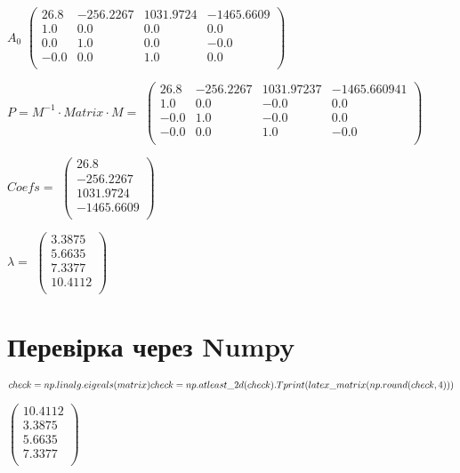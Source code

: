 \documentclass{article}
\begin{document}
    $A_0$
    $
    \left(\begin{matrix}
        26.8 & -256.2267 & 1031.9724 & -1465.6609 \\
        1.0 & 0.0 & 0.0 & 0.0 \\
        0.0 & 1.0 & 0.0 & -0.0 \\
        -0.0 & 0.0 & 1.0 & 0.0 \\
    \end{matrix}\right)
    $

    $P = M^{-1} \cdot Matrix \cdot M = $
    $
    \left(\begin{matrix}
        26.8 & -256.2267 & 1031.97237 & -1465.660941 \\
        1.0 & 0.0 & -0.0 & 0.0 \\
        -0.0 & 1.0 & -0.0 & 0.0 \\
        -0.0 & 0.0 & 1.0 & -0.0 \\
    \end{matrix}\right)
    $

    $ Coefs = $
    $
    \left(\begin{matrix}
        26.8 \\
        -256.2267 \\
        1031.9724 \\
        -1465.6609 \\
    \end{matrix}\right)
    $

    $ \lambda = $
    $
    \left(\begin{matrix}
        3.3875 \\
        5.6635 \\
        7.3377 \\
        10.4112 \\
    \end{matrix}\right)
    $

    \section{Перевірка через Numpy}

    $
    check = np.linalg.eigvals(matrix)\\
    check = np.atleast\_2d(check).T\\
    print(latex\_matrix(np.round(check, 4)))
    $

    $
    \left(\begin{matrix}
        10.4112 \\
        3.3875 \\
        5.6635 \\
        7.3377 \\
    \end{matrix}\right)
    $
\end{document}
